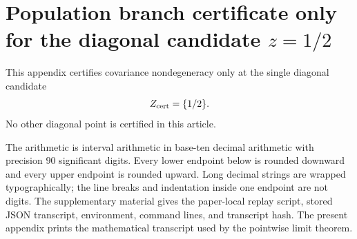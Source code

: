 \section{Population branch certificate only for the diagonal candidate
\texorpdfstring{\(z=1/2\)}{z=1/2}}\label{app:self-contained-diagonal-branch-certificate-main}

This appendix certifies covariance nondegeneracy only at the single diagonal
candidate
\[
Z_{\rm cert}=\{1/2\}.
\]
No other diagonal point is certified in this article.

The arithmetic is interval arithmetic in base-ten decimal arithmetic with
precision \(90\) significant digits.  Every lower endpoint below is rounded
downward and every upper endpoint is rounded upward.  Long decimal strings are
wrapped typographically; the line breaks and indentation inside one endpoint
are not digits.  The supplementary material gives the paper-local replay
script, stored JSON transcript, environment, command lines, and transcript
hash.  The present appendix prints the mathematical transcript used by the
pointwise limit theorem.

